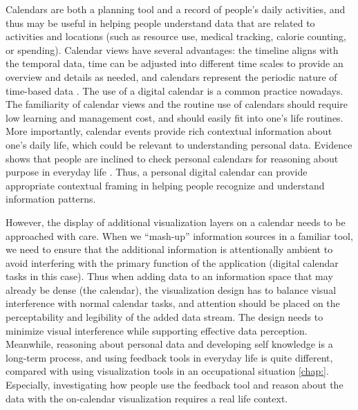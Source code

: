 \documentclass[12pt,oneside]{book}
\begin{document}
Calendars are both a planning tool and a record of people's daily activities, and thus may be useful in helping people understand data that are related to activities and locations (such as resource use, medical tracking, calorie counting, or spending).
Calendar views have several advantages: the timeline aligns with the temporal data, time can be adjusted into different time scales to provide an overview and details as needed, and calendars represent the periodic nature of time-based data \cite{van_wijk_cluster_1999}.  The use of a digital calendar is a common practice nowadays. The familiarity of calendar views and the routine use of calendars should require low learning and management cost, and should easily fit into one's life routines.  More importantly, calendar events provide rich contextual information about one's daily life, which could be relevant to understanding personal data.  Evidence shows that people are inclined to check personal calendars for reasoning about purpose in everyday life \cite{baur_streams_2010,lee_reflecting_2011,mcduff_affectaura:_2012,neustaedter_everyday_2013}.  Thus, a personal digital calendar can provide appropriate contextual framing in helping people recognize and understand information patterns.

However, the display of additional visualization layers on a calendar needs to be approached with care.  When we ``mash-up'' information sources in a familiar tool, we need to ensure that the additional information is attentionally ambient to avoid interfering with the primary function of the application (digital calendar tasks in this case).  Thus when adding data to an information space that may already be dense (the calendar), the visualization design has to balance visual interference with normal calendar tasks, and attention should be placed on the perceptability and legibility of the added data stream.  The design needs to minimize visual interference while supporting effective data perception.  Meanwhile, reasoning about personal data and developing self knowledge is a long-term process, and using feedback tools in everyday life is quite different, compared with using visualization tools in an occupational situation \ref{chap:}.  Especially, investigating how people use the feedback tool and reason about the data with the on-calendar visualization requires a real life context. 

\end{document}
